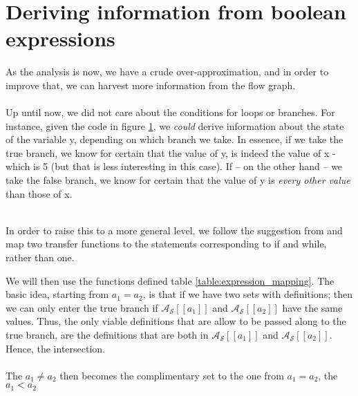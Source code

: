 \section{Deriving information from boolean expressions}
As the analysis is now, we have a crude over-approximation, and in order to improve that, we can harvest more information from the flow graph.\\\\
Up until now, we did not care about the conditions for loops or branches. For instance, given the code in figure \ref{fig:if_flow_example}, we \emph{could} derive information about the state of the variable y, depending on which branch we take. In essence, if we take the true branch, we know for certain that the value of y, is indeed the value of x - which is 5 (but that is less interesting in this case). If -- on the other hand -- we take the false branch, we know for certain that the value of y is \emph{every other value} than those of x.\\\\
\begin{figure}[h]
\centering
{}
 \caption{}
 \label{fig:if_flow_example}
\end{figure} In order to raise this to a more general level, we follow the suggestion from \cite{02242_slides} and map two transfer functions to the statements corresponding to if and while, rather than one.


We will then use the functions defined table \ref{table:expression_mapping}. The basic idea, starting from $a_1 = a_2$, is that if we have two sets with definitions; then we can only enter the true branch if $\mathcal{A_S}[\![a_1]\!]$ and $\mathcal{A_S}[\![a_2]\!]$ have the same values. Thus, the only viable definitions that are allow to be passed along to the true branch, are the definitions that are both in $\mathcal{A_S}[\![a_1]\!]$ and $\mathcal{A_S}[\![a_2]\!]$. Hence, the intersection.\\\\
The $a_1 \neq a_2$ then becomes the complimentary set to the one from $a_1 = a_2$, the $a_1 < a_2$ %


